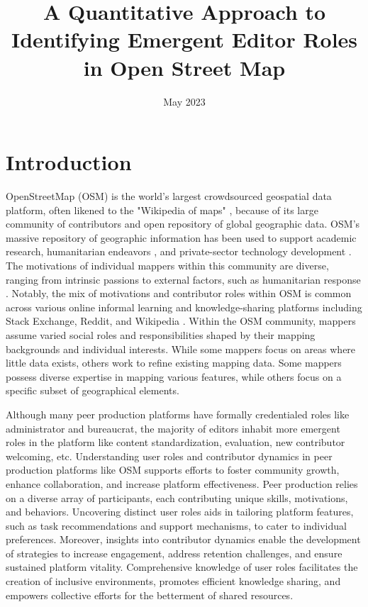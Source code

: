 \documentclass[manuscript,screen,review]{acmart}
\title{A Quantitative Approach to Identifying Emergent Editor Roles in Open Street Map}
\date{May 2023}
\begin{document}
\maketitle

\section{Introduction}

OpenStreetMap (OSM) is the world's largest crowdsourced geospatial data platform, often likened to the "Wikipedia of maps" \cite{steve11}, because of its large community of contributors and open repository of global geographic data. OSM's massive repository of geographic information has been used to support academic research, humanitarian endeavors \cite{soden2014crowdsourced}, and private-sector technology development \cite{Anderson19}. The motivations of individual mappers within this community are diverse, ranging from intrinsic passions to external factors, such as humanitarian response \cite{Budhathoki13}. Notably, the mix of motivations and contributor roles within OSM is common across various online informal learning and knowledge-sharing platforms including Stack Exchange, Reddit, and Wikipedia \cite{Saxena21}. Within the OSM community, mappers assume varied social roles and responsibilities shaped by their mapping backgrounds and individual interests. While some mappers focus on areas where little data exists, others work to refine existing mapping data. Some mappers possess diverse expertise in mapping various features, while others focus on a specific subset of geographical elements. 

Although many peer production platforms have formally credentialed roles like administrator and bureaucrat, the majority of editors inhabit more emergent roles in the platform like content standardization, evaluation, new contributor welcoming, etc. \cite{Keegan15} Understanding user roles and contributor dynamics in peer production platforms like OSM supports efforts to foster community growth, enhance collaboration, and increase platform effectiveness\cite{Saxena21}. Peer production relies on a diverse array of participants, each contributing unique skills, motivations, and behaviors\cite{Saxena21}. Uncovering distinct user roles aids in tailoring platform features, such as task recommendations and support mechanisms, to cater to individual preferences\cite{hot_task_manager,maproulette}. Moreover, insights into contributor dynamics enable the development of strategies to increase engagement, address retention challenges, and ensure sustained platform vitality. Comprehensive knowledge of user roles facilitates the creation of inclusive environments, promotes efficient knowledge sharing, and empowers collective efforts for the betterment of shared resources.
\end{document}
